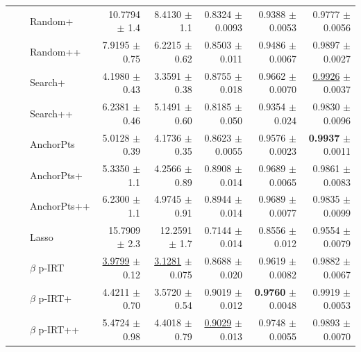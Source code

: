 \begin{longtable}{llp{}rrrrr}
 &  & Random+ & 10.7794 {\scriptsize $\pm$ 1.4} & 8.4130 {\scriptsize $\pm$ 1.1} & 0.8324 {\scriptsize $\pm$ 0.0093} & 0.9388 {\scriptsize $\pm$ 0.0053} & 0.9777 {\scriptsize $\pm$ 0.0056} \\
 &  & Random++ & 7.9195 {\scriptsize $\pm$ 0.75} & 6.2215 {\scriptsize $\pm$ 0.62} & 0.8503 {\scriptsize $\pm$ 0.011} & 0.9486 {\scriptsize $\pm$ 0.0067} & 0.9897 {\scriptsize $\pm$ 0.0027} \\
 &  & Search+ & 4.1980 {\scriptsize $\pm$ 0.43} & 3.3591 {\scriptsize $\pm$ 0.38} & 0.8755 {\scriptsize $\pm$ 0.018} & 0.9662 {\scriptsize $\pm$ 0.0070} & \underline{0.9926} {\scriptsize $\pm$ 0.0037} \\
 &  & Search++ & 6.2381 {\scriptsize $\pm$ 0.46} & 5.1491 {\scriptsize $\pm$ 0.60} & 0.8185 {\scriptsize $\pm$ 0.050} & 0.9354 {\scriptsize $\pm$ 0.024} & 0.9830 {\scriptsize $\pm$ 0.0096} \\
 &  & AnchorPts & 5.0128 {\scriptsize $\pm$ 0.39} & 4.1736 {\scriptsize $\pm$ 0.35} & 0.8623 {\scriptsize $\pm$ 0.0055} & 0.9576 {\scriptsize $\pm$ 0.0023} & \textbf{0.9937} {\scriptsize $\pm$ 0.0011} \\
 &  & AnchorPts+ & 5.3350 {\scriptsize $\pm$ 1.1} & 4.2566 {\scriptsize $\pm$ 0.89} & 0.8908 {\scriptsize $\pm$ 0.014} & 0.9689 {\scriptsize $\pm$ 0.0065} & 0.9861 {\scriptsize $\pm$ 0.0083} \\
 &  & AnchorPts++ & 6.2300 {\scriptsize $\pm$ 1.1} & 4.9745 {\scriptsize $\pm$ 0.91} & 0.8944 {\scriptsize $\pm$ 0.014} & 0.9689 {\scriptsize $\pm$ 0.0077} & 0.9835 {\scriptsize $\pm$ 0.0099} \\
 &  & Lasso & 15.7909 {\scriptsize $\pm$ 2.3} & 12.2591 {\scriptsize $\pm$ 1.7} & 0.7144 {\scriptsize $\pm$ 0.014} & 0.8556 {\scriptsize $\pm$ 0.012} & 0.9554 {\scriptsize $\pm$ 0.0079} \\
 &  & $\beta$ p-IRT & \underline{3.9799} {\scriptsize $\pm$ 0.12} & \underline{3.1281} {\scriptsize $\pm$ 0.075} & 0.8688 {\scriptsize $\pm$ 0.020} & 0.9619 {\scriptsize $\pm$ 0.0082} & 0.9882 {\scriptsize $\pm$ 0.0067} \\
 &  & $\beta$ p-IRT+ & 4.4211 {\scriptsize $\pm$ 0.70} & 3.5720 {\scriptsize $\pm$ 0.54} & 0.9019 {\scriptsize $\pm$ 0.012} & \textbf{0.9760} {\scriptsize $\pm$ 0.0048} & 0.9919 {\scriptsize $\pm$ 0.0053} \\
 &  & $\beta$ p-IRT++ & 5.4724 {\scriptsize $\pm$ 0.98} & 4.4018 {\scriptsize $\pm$ 0.79} & \underline{0.9029} {\scriptsize $\pm$ 0.013} & 0.9748 {\scriptsize $\pm$ 0.0055} & 0.9893 {\scriptsize $\pm$ 0.0070} \\

\end{longtable}
